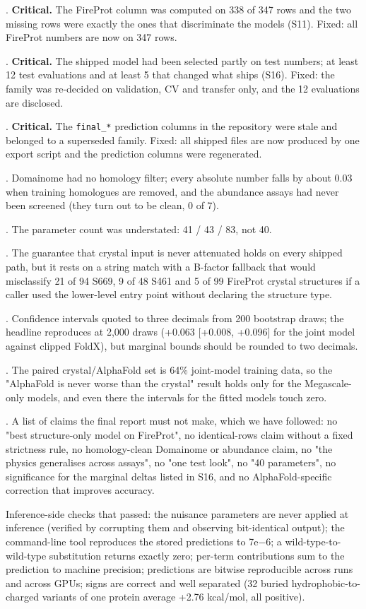 \documentclass[11pt,a4paper]{article}
\begin{document}
\par{}. \textbf{Critical.} The FireProt column was computed on 338 of 347 rows and the two missing rows were exactly the
   ones that discriminate the models (S11). Fixed: all FireProt numbers are now on 347 rows.
\par{}. \textbf{Critical.} The shipped model had been selected partly on test numbers; at least 12 test evaluations and at
   least 5 that changed what ships (S16). Fixed: the family was re-decided on validation, CV and transfer only,
   and the 12 evaluations are disclosed.
\par{}. \textbf{Critical.} The \texttt{final\_*} prediction columns in the repository were stale and belonged to a superseded
   family. Fixed: all shipped files are now produced by one export script and the prediction columns were
   regenerated.
\par{}. Domainome had no homology filter; every absolute number falls by about 0.03 when training homologues are
   removed, and the abundance assays had never been screened (they turn out to be clean, 0 of 7).
\par{}. The parameter count was understated: 41 / 43 / 83, not 40.
\par{}. The guarantee that crystal input is never attenuated holds on every shipped path, but it rests on a string
   match with a B-factor fallback that would misclassify 21 of 94 S669, 9 of 48 S461 and 5 of 99 FireProt
   crystal structures if a caller used the lower-level entry point without declaring the structure type.
\par{}. Confidence intervals quoted to three decimals from 200 bootstrap draws; the headline reproduces at 2,000
   draws (+0.063 [+0.008, +0.096] for the joint model against clipped FoldX), but marginal bounds should be
   rounded to two decimals.
\par{}. The paired crystal/AlphaFold set is 64\% joint-model training data, so the "AlphaFold is never worse than the
   crystal" result holds only for the Megascale-only models, and even there the intervals for the fitted models
   touch zero.
\par{}. A list of claims the final report must not make, which we have followed: no "best structure-only model on
   FireProt", no identical-rows claim without a fixed strictness rule, no homology-clean Domainome or abundance
   claim, no "the physics generalises across assays", no "one test look", no "40 parameters", no significance
   for the marginal deltas listed in S16, and no AlphaFold-specific correction that improves accuracy.

Inference-side checks that passed: the nuisance parameters are never applied at inference (verified by
corrupting them and observing bit-identical output); the command-line tool reproduces the stored predictions to
7e$-$6; a wild-type-to-wild-type substitution returns exactly zero; per-term contributions sum to the prediction
to machine precision; predictions are bitwise reproducible across runs and across GPUs; signs are correct and
well separated (32 buried hydrophobic-to-charged variants of one protein average +2.76 kcal/mol, all positive).
\end{document}

